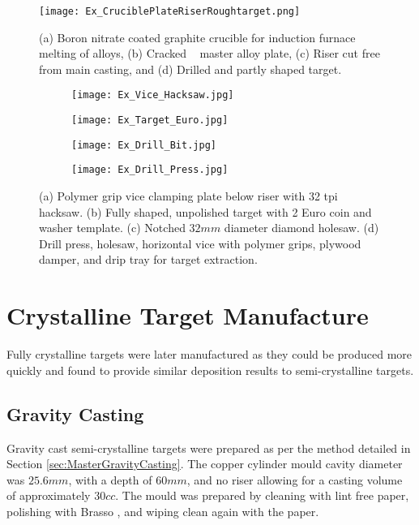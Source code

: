 \begin{figure}[htbp]
	\centering
	\texttt{[image: Ex\_CruciblePlateRiserRoughtarget.png]}
	\caption{(a) Boron nitrate coated graphite crucible for induction furnace melting of alloys, (b) Cracked \MgZnCa~ master alloy plate, (c) Riser cut free from main casting, and (d) Drilled and partly shaped target.}
	\label{fig:CrucibleShaping}
\end{figure}

\begin{figure}[htbp]
	\centering
	\begin{subfigure}[htbp]{0.49\textwidth}
		\texttt{[image: Ex\_Vice\_Hacksaw.jpg]}
		\caption{}
		\label{fig:Vice}
	\end{subfigure}
	\begin{subfigure}[htbp]{0.38\textwidth}
		\texttt{[image: Ex\_Target\_Euro.jpg]}
		\caption{}
		\label{fig:TargetEuro}
	\end{subfigure}
	\begin{subfigure}[htbp]{0.275\textwidth}
		\texttt{[image: Ex\_Drill\_Bit.jpg]}
		\caption{}
		\label{fig:DrillBit}
	\end{subfigure}
	\begin{subfigure}[htbp]{0.30\textwidth}
		\texttt{[image: Ex\_Drill\_Press.jpg]}
		\caption{}
		\label{fig:DrillPress}
	\end{subfigure}
	\caption{(a) Polymer grip vice clamping plate below riser with 32 \acrshort{tpi} hacksaw. (b) Fully shaped, unpolished target with 2 Euro coin and washer template. (c) Notched $32 mm$ diameter diamond holesaw. (d) Drill press, holesaw, horizontal vice with polymer grips, plywood damper, and drip tray for target extraction.}%
	\label{fig:ShapingEquipment}
\end{figure}

\section{Crystalline Target Manufacture}
Fully crystalline targets were later manufactured as they could be produced more quickly and found to provide similar deposition results to semi-crystalline targets.

\subsection{Gravity Casting}
Gravity cast semi-crystalline targets were prepared as per the method detailed in Section \ref{sec:MasterGravityCasting}. The copper cylinder mould cavity diameter was $25.6 mm$, with a depth of $60 mm$, and no riser allowing for a casting volume of approximately $30 cc$. The mould was prepared by cleaning with lint free paper, polishing with Brasso \textcopyright, and wiping clean again with the paper.

